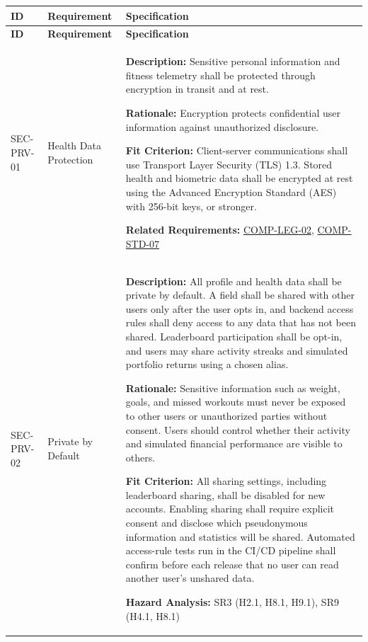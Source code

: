 \documentclass[12pt]{article}
\newcommand{\acr}[3]{\phantomsection\label{acr:#1}#2 (#3)}
\begin{document}
\small
\setlength{\tabcolsep}{4pt}
\begin{xltabular}{\textwidth}{|p{2.6cm}|p{3.4cm}|X|}
\hline
\textbf{ID} & \textbf{Requirement} & \textbf{Specification} \\
\hline
\endfirsthead
\hline
\textbf{ID} & \textbf{Requirement} & \textbf{Specification} \\
\hline
\endhead

SEC-PRV-01\hypertarget{req:SEC-PRV-01}{} &
Health Data Protection &
\textbf{Description:} Sensitive personal information and fitness telemetry shall be protected through encryption in transit and at rest.

\textbf{Rationale:} Encryption protects confidential user information against unauthorized disclosure.

\textbf{Fit Criterion:} Client-server communications shall use \acr{TLS}{Transport Layer Security}{TLS} 1.3. Stored health and biometric data shall be encrypted at rest using the \acr{AES}{Advanced Encryption Standard}{AES} with 256-bit keys, or stronger. 

\textbf{Related Requirements:} \hyperlink{req:COMP-LEG-02}{COMP-LEG-02}, \hyperlink{req:COMP-STD-07}{COMP-STD-07}\\
\hline

SEC-PRV-02\hypertarget{req:SEC-PRV-02}{} &
Private by Default &
\textbf{Description:} All profile and health data shall be private by default. A field shall be shared with other users only after the user opts in, and backend access rules shall deny access to any data that has not been shared. Leaderboard participation shall be opt-in, and users may share activity streaks and simulated portfolio returns using a chosen alias.

\textbf{Rationale:} Sensitive information such as weight, goals, and missed workouts must never be exposed to other users or unauthorized parties without consent. Users should control whether their activity and simulated financial performance are visible to others.

\textbf{Fit Criterion:} All sharing settings, including leaderboard sharing, shall be disabled for new accounts. Enabling sharing shall require explicit consent and disclose which pseudonymous information and statistics will be shared. Automated access-rule tests run in the CI/CD pipeline shall confirm before each release that no user can read another user's unshared data.

\textbf{Hazard Analysis:} SR3 (H2.1, H8.1, H9.1), SR9 (H4.1, H8.1) 


\end{xltabular}
\end{document}
